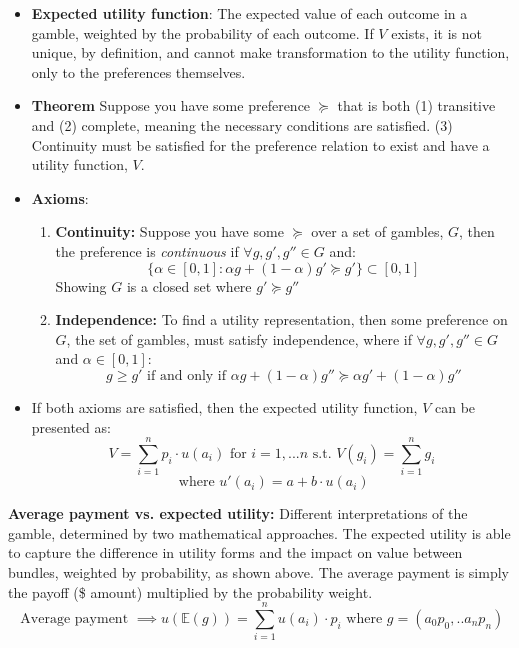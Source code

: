 \documentclass{article}
\begin{document}
\begin{itemize}
    \item \textbf{Expected utility function}: The expected value of each outcome in a gamble, weighted by the probability of each outcome. If $V$ exists, it is not unique, by definition, and cannot make transformation to the utility function, only to the preferences themselves. 
    \item \textbf{Theorem} Suppose you have some preference $\succeq$ that is both (1) transitive and (2) complete, meaning the necessary conditions are satisfied. (3) Continuity must be satisfied for the preference relation to exist and have a utility function, $V$. 
    \item \textbf{Axioms}:
    \begin{enumerate}
        \item \textbf{Continuity:} Suppose you have some $\succeq$ over a set of gambles, $G$, then the preference is \textit{continuous} if $\forall g, g', g'' \in G$ and: \[
        \{ \alpha \in [0,1]: \alpha g + (1-\alpha)g' \succeq g' \} \subset [0,1]
        \] Showing $G$ is a closed set where $g' \succeq g''$
        \item \textbf{Independence:} To find a utility representation, then some preference on $G$, the set of gambles, must satisfy independence, where if $\forall g, g', g'' \in G$ and $\alpha \in [0,1]$: \[
        g \geq g'  \text{ if and only if } \alpha g + (1-\alpha)g'' \succeq \alpha g' + (1-\alpha)g''
        \]
    \end{enumerate}
    \item If both axioms are satisfied, then the expected utility function, $V$ can be presented as: \[
        V = \sum_{i = 1}^{n}p_i\cdot u(a_i) \text{ for } i =  1,...n \text{ s.t. } V(g_i) = \sum_{i=1}^{n} g_i
        \]
        \[
        \text{ where } u'(a_i) = a + b\cdot u(a_i)
        \]
    \end{itemize}

\noindent \textbf{Average payment vs. expected utility:} Different interpretations of the gamble, determined by two mathematical approaches. The expected utility is able to capture the difference in utility forms and the impact on value between bundles, weighted by probability, as shown above. The average payment is simply the payoff (\$ amount) multiplied by the probability weight.
    \[
    \text{ Average payment } \implies u(\mathbb{E}(g)) = \sum_{i=1}^{n}u(a_i)\cdot p_i \text{ where } g = (a_0p_0,..a_np_n)
    \]
\end{document}
